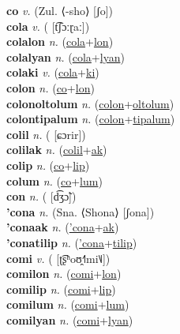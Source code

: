 \textbf{co} \textit{v.} (Zul. ⟨-sho⟩ [ʃo])
 \label{co} \\
\textbf{cola} \textit{v.} ( [t͡ʃɔːɽaː])
 \label{cola} \\
\textbf{colalon} \textit{n.} (\hyperref[cola]{cola}+\hyperref[lon]{lon})
 \label{colalon} \\
\textbf{colalyan} \textit{n.} (\hyperref[cola]{cola}+\hyperref[lyan]{lyan})
 \label{colalyan} \\
\textbf{colaki} \textit{v.} (\hyperref[cola]{cola}+\hyperref[ki]{ki})
 \label{colaki} \\
\textbf{colon} \textit{n.} (\hyperref[co]{co}+\hyperref[lon]{lon})
 \label{colon} \\
\textbf{colonoltolum} \textit{n.} (\hyperref[colon]{colon}+\hyperref[oltolum]{oltolum})
 \label{colonoltolum} \\
\textbf{colontipalum} \textit{n.} (\hyperref[colon]{colon}+\hyperref[tipalum]{tipalum})
 \label{colontipalum} \\
\textbf{colil} \textit{n.} ( [ɕɔrir])
 \label{colil} \\
\textbf{colilak} \textit{n.} (\hyperref[colil]{colil}+\hyperref[ak]{ak})
 \label{colilak} \\
\textbf{colip} \textit{n.} (\hyperref[co]{co}+\hyperref[lip]{lip})
 \label{colip} \\
\textbf{colum} \textit{n.} (\hyperref[co]{co}+\hyperref[lum]{lum})
 \label{colum} \\
\textbf{con} \textit{n.} ( [d͡ʒɔ̃])
 \label{con} \\
\textbf{'cona} \textit{n.} (Sna. ⟨Shona⟩ [ʃona])
 \label{'cona} \\
\textbf{'conaak} \textit{n.} (\hyperref['cona]{'cona}+\hyperref[ak]{ak})
 \label{'conaak} \\
\textbf{'conatilip} \textit{n.} (\hyperref['cona]{'cona}+\hyperref[tilip]{tilip})
 \label{'conatilip} \\
\textbf{comi} \textit{v.} ( [ʈ͡ʂʰoʊ̯˧˥mi˥˩])
 \label{comi} \\
\textbf{comilon} \textit{n.} (\hyperref[comi]{comi}+\hyperref[lon]{lon})
 \label{comilon} \\
\textbf{comilip} \textit{n.} (\hyperref[comi]{comi}+\hyperref[lip]{lip})
 \label{comilip} \\
\textbf{comilum} \textit{n.} (\hyperref[comi]{comi}+\hyperref[lum]{lum})
 \label{comilum} \\
\textbf{comilyan} \textit{n.} (\hyperref[comi]{comi}+\hyperref[lyan]{lyan})
